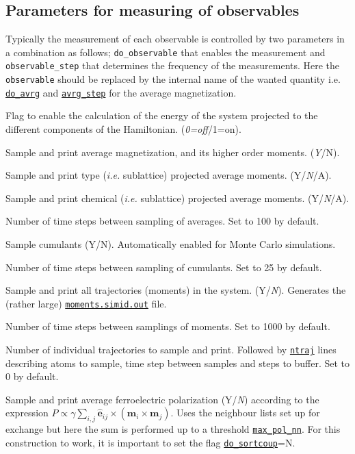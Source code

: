 \documentclass[11pt,fleqn,a4]{book} %
\makeatletter
\newcommand{\litem}[1]{\item[\bfseries#1\index{#1@\texttt{#1}}\label{#1}]}
\newcommand{\rkeyword}[1]{\hyperref[#1]{\texttt{#1}}}
\newcommand{\rfilename}[1]{\hyperref[#1]{\texttt{#1}}}
\makeatother
\begin{document}
\subsection{Parameters for measuring of observables}
Typically the measurement of each observable is controlled by two parameters in a combination as follows; \texttt{do_observable} that enables the measurement and \texttt{observable_step} that determines the frequency of the measurements. Here the \texttt{observable} should be replaced by the internal name of the wanted quantity i.e. \rkeyword{do_avrg} and \rkeyword{avrg_step} for the average magnetization.
\begin{description}[leftmargin=!,labelwidth=\widthof{\bfseries fifteenchars}]
\litem{plotenergy} Flag to enable the calculation of the energy of the system projected to the different components of the Hamiltonian. (\emph{0=off}/1=on).
\litem{do_avrg} Sample and print average magnetization, and its higher order moments. (\emph{Y}/N).
\litem{do_proj_avrg} Sample and print type (\textit{i.e.} sublattice) projected average moments. (Y/\emph{N}/A).
\litem{do_projch_avrg} Sample and print chemical (\textit{i.e.} sublattice) projected average moments. (Y/\emph{N}/A).
\litem{avrg_step} Number of time steps between sampling of averages. Set to 100 by default.
\litem{do_cumu} Sample cumulants (Y/N). Automatically enabled for Monte Carlo simulations.
\litem{cumu_step} Number of time steps between sampling of cumulants. Set to 25 by default.
\litem{do_tottraj} Sample and print all trajectories (moments) in the system. (Y/\emph{N}). Generates the (rather large) \rfilename{moments.simid.out} file.
\litem{tottraj_step} Number of time steps between samplings of moments. Set to 1000 by default.
\litem{ntraj} Number of individual trajectories to sample and print. Followed by \rkeyword{ntraj} lines describing atoms to sample, time step between samples and steps to buffer. Set to 0 by default.
\litem{do_pol} Sample and print average ferroelectric polarization (Y/\emph{N}) according to the expression $P\propto \gamma\sum_{i,j}\hat{\mathbf{e}}_{ij}\times(\mathbf{m}_i\times\mathbf{m}_j)$. Uses the neighbour lists set up for exchange but here the sum is performed up to a threshold \rkeyword{max_pol_nn}. For this construction to work, it is important to set the flag \rkeyword{do_sortcoup}=N.

\end{description}
\end{document}
